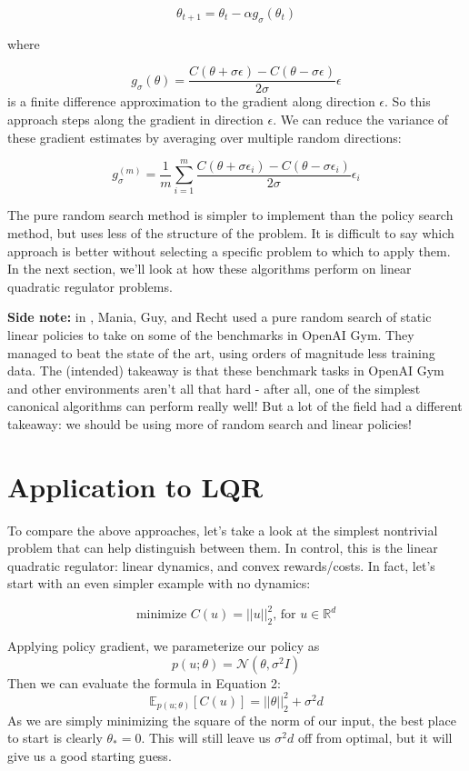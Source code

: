 \documentclass{article}[12pt]
\def\R{\mathbb{R}}
\def\E{\mathbb{E}}
\def \E{\mathbb E}
\def \R{\mathbb R}
\begin{document}
$$\theta_{t+1} = \theta_t -\alpha g_\sigma(\theta_t)$$

where 

$$g_\sigma (\theta) = \frac{C(\theta + \sigma \epsilon) - C(\theta - \sigma \epsilon)}{2 \sigma}\epsilon$$
is a finite difference approximation to the gradient along direction $\epsilon$. So this approach steps along the gradient in direction $\epsilon$. We can reduce the variance of these gradient estimates by averaging over multiple random directions:

$$g_\sigma^{(m)} = \frac{1}{m}\sum_{i = 1}^m \frac{C(\theta + \sigma \epsilon_i) - C(\theta - \sigma \epsilon_i)}{2 \sigma}\epsilon_i$$

The pure random search method is simpler to implement than the policy search method, but uses less of the structure of the problem. It is difficult to say which approach is better without selecting a specific problem to which to apply them. In the next section, we'll look at how these algorithms perform on linear quadratic regulator problems. 

\textbf{Side note:} in \cite{Mania2018}, Mania, Guy, and Recht used a pure random search of static linear policies to take on some of the benchmarks in OpenAI Gym. They managed to beat the state of the art, using orders of magnitude less training data. The (intended) takeaway is that these benchmark tasks in OpenAI Gym and other environments aren't all that hard - after all, one of the simplest canonical algorithms can perform really well! But a lot of the field had a different takeaway: we should be using more of random search and linear policies! 

\section{Application to LQR}
To compare the above approaches, let's take a look at the simplest nontrivial problem that can help distinguish between them. In control, this is the linear quadratic regulator: linear dynamics, and convex rewards/costs. In fact, let's start with an even simpler example with no dynamics:

$$\text{minimize }C(u) = ||u||_2^2 \text{, for }u\in \R^d$$

Applying policy gradient, we parameterize our policy as 
$$p(u;\theta) = \mathcal{N}(\theta,\sigma^2 I)$$
Then we can evaluate the formula in Equation 2:
$$\E_{p(u;\theta)}[C(u)] = ||\theta||_2^2+\sigma^2d$$
As we are simply minimizing the square of the norm of our input, the best place to start is clearly $\theta_* = 0$. This will still leave us $\sigma^2d$ off from optimal, but it will give us a good starting guess.
\end{document}

